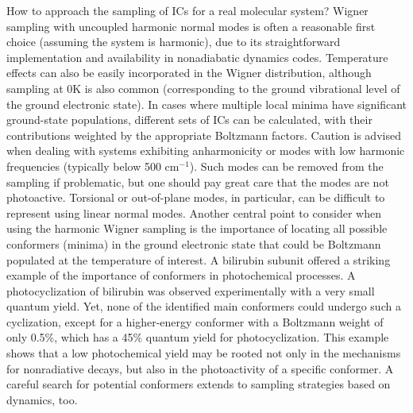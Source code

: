 \documentclass[9pt,bestpractices]{livecoms}
\begin{document}
How to approach the sampling of ICs for a real molecular system?  Wigner sampling with uncoupled harmonic normal modes is often a reasonable first choice (assuming the system is harmonic), due to its straightforward implementation and availability in nonadiabatic dynamics codes. Temperature effects can also be easily incorporated in the Wigner distribution, although sampling at 0K is also common (corresponding to the ground vibrational level of the ground electronic state). In cases where multiple local minima have significant ground-state populations, different sets of ICs can be calculated, with their contributions weighted by the appropriate Boltzmann factors.\cite{marsili2022theoretical} Caution is advised when dealing with systems exhibiting anharmonicity or modes with low harmonic frequencies (typically below 500 cm$^{-1}$). Such modes can be removed from the sampling if problematic,\cite{persico2014overview,favero2013dynamics} but one should pay great care that the modes are not photoactive.\cite{prlj2023deciphering} Torsional or out-of-plane modes, in particular, can be difficult to represent using linear normal modes.\cite{mccoy2014role,C8FD90051E} Another central point to consider when using the harmonic Wigner sampling is the importance of locating all possible conformers (minima) in the ground electronic state that could be Boltzmann populated at the temperature of interest. A bilirubin subunit offered a striking example of the importance of conformers in photochemical processes. A photocyclization of bilirubin was observed experimentally with a very small quantum yield. Yet, none of the identified main conformers could undergo such a cyclization, except for a higher-energy conformer with a Boltzmann weight of only 0.5\%, which has a 45\% quantum yield for photocyclization.\cite{janos2020bilirubin} This example shows that a low photochemical yield may be rooted not only in the mechanisms for nonradiative decays, but also in the photoactivity of a specific conformer. A careful search for potential conformers extends to sampling strategies based on dynamics, too. 
\end{document}
